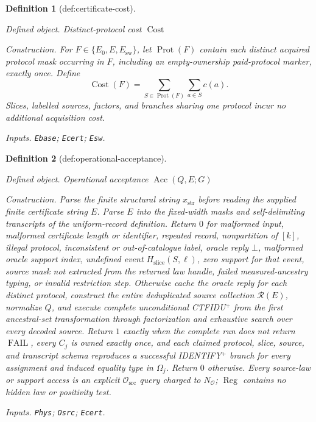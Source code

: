 \documentclass{article}
\newtheorem{definition}{Definition}
\begin{document}
\begin{definition}[def:certificate-cost]\label{def:certificate-cost}
\par\smallskip\noindent\emph{Defined object.} Distinct-protocol cost \(\operatorname{Cost}\)
\par\smallskip\noindent\emph{Construction.} For \(F\in\{E_0,E,E_{\mathrm{sw}}\}\), let \(\operatorname{Prot}(F)\) contain each distinct acquired protocol mask occurring in \(F\), including an empty-ownership paid-protocol marker, exactly once.  Define
\[
 \operatorname{Cost}(F)=\sum_{S\in\operatorname{Prot}(F)}\sum_{a\in S}c(a).
\]
Slices, labelled sources, factors, and branches sharing one protocol incur no additional acquisition cost.
\par\smallskip\noindent\emph{Inputs.} \texttt{Ebase}; \texttt{Ecert}; \texttt{Esw}.
\end{definition}

\begin{definition}[def:operational-acceptance]\label{def:operational-acceptance}
\par\smallskip\noindent\emph{Defined object.} Operational acceptance \(\operatorname{Acc}(Q,E;G)\)
\par\smallskip\noindent\emph{Construction.} Parse the finite structural string \(x_{\mathrm{str}}\) before reading the supplied finite certificate string \(E\). Parse \(E\) into the fixed-width masks and self-delimiting transcripts of the uniform-record definition. Return \(0\) for malformed input, malformed certificate length or identifier, repeated record, nonpartition of \([k]\), illegal protocol, inconsistent or out-of-catalogue label, oracle reply \(\bot\), malformed oracle support index, undefined event \(H_{\mathrm{slice}}(S,\ell)\), zero support for that event, source mask not extracted from the returned law handle, failed measured-ancestry typing, or invalid restriction step. Otherwise cache the oracle reply for each distinct protocol, construct the entire deduplicated source collection \(\mathcal R(E)\), normalize \(Q\), and execute complete unconditional CTFIDU\({}^{+}\) from the first ancestral-set transformation through factorization and exhaustive search over every decoded source. Return \(1\) exactly when the complete run does not return \(\operatorname{FAIL}\), every \(C_j\) is owned exactly once, and each claimed protocol, slice, source, and transcript schema reproduces a successful IDENTIFY\({}^{+}\) branch for every assignment and induced equality type in \(\Omega_j\). Return \(0\) otherwise. Every source-law or support access is an explicit \(\mathcal O_{\mathrm{src}}\) query charged to \(N_{\mathcal O}\); \(\operatorname{Reg}\) contains no hidden law or positivity test.
\par\smallskip\noindent\emph{Inputs.} \texttt{Phys}; \texttt{Osrc}; \texttt{Ecert}.
\end{definition}
\end{document}
